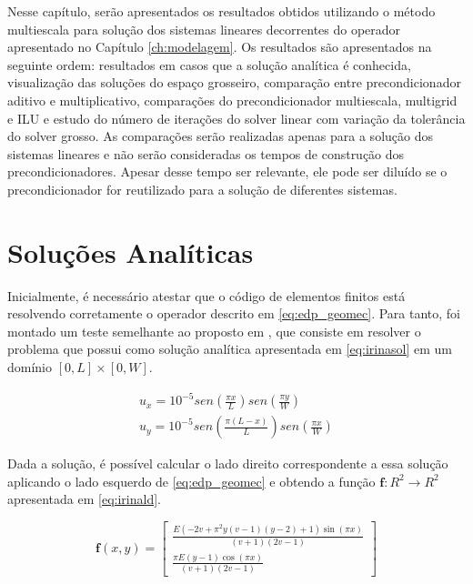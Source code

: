 Nesse capítulo, serão apresentados os resultados obtidos utilizando o método multiescala para solução dos sistemas lineares decorrentes do operador apresentado no Capítulo \ref{ch:modelagem}. Os resultados são apresentados na seguinte ordem: resultados em casos que a solução analítica é conhecida, visualização das soluções do espaço grosseiro, comparação entre precondicionador aditivo e multiplicativo, comparações do precondicionador multiescala, multigrid e ILU e estudo do número de iterações do solver linear com variação da tolerância do solver grosso. As comparações serão realizadas apenas para a solução dos sistemas lineares e não serão consideradas os tempos de construção dos precondicionadores. Apesar desse tempo ser relevante, ele pode ser diluído se o precondicionador for reutilizado para a solução de diferentes sistemas. 

\section{Soluções Analíticas}

Inicialmente, é necessário atestar que o código de elementos finitos está resolvendo corretamente o operador descrito em \eqref{eq:edp_geomec}. Para tanto, foi montado um teste semelhante ao proposto em \cite{irina}, que consiste em resolver o problema que possui como solução analítica apresentada em \eqref{eq:irinasol} em um domínio  $[0, L] \times [0, W]$.


\begin{equation} \label{eq:irinasol}
  \begin{aligned}
  u_x = 10^{-5} sen(\frac{\pi x}{L}) sen(\frac{\pi y}{W})  \\
  u_y = 10^{-5} sen(\frac{\pi (L-x)}{L}) sen(\frac{\pi x}{W})
  \end{aligned}
\end{equation}

Dada a solução, é possível calcular o lado direito correspondente a essa solução aplicando o lado esquerdo de \eqref{eq:edp_geomec} e obtendo a função $\mathbf{f}: R^2 \rightarrow R^2$ apresentada em \eqref{eq:irinald}. 

\begin{equation} \label{eq:irinald}
\mathbf{f}(x, y) = 
\left[\begin{matrix}\frac{E \left(- 2 v + \pi^{2} y \left(v - 1\right) \left(y - 2\right) + 1\right) \sin{\left (\pi x \right )}}{\left(v + 1\right) \left(2 v - 1\right)} \\ \frac{\pi E \left(y - 1\right) \cos{\left (\pi x \right )}}{\left(v + 1\right) \left(2 v - 1\right)}\end{matrix}\right]
\end{equation}

